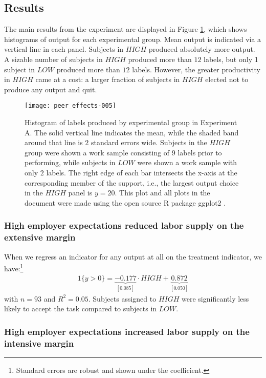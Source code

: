 \documentclass[12pt]{article}
\begin{document}
\subsection{Results} 
The main results from the experiment are displayed in Figure
\ref{fig:ExpA.output}, which shows histograms of output for each
experimental group. Mean output is indicated via a vertical line in
each panel. Subjects in $HIGH$ produced absolutely more output. A
sizable number of subjects in $HIGH$ produced more than $12$ labels,
but only 1 subject in $LOW$ produced more than $12$ labels. However,
the greater productivity in $HIGH$ came at a cost: a larger fraction
of subjects in $HIGH$ elected not to produce any output and quit.

\begin{figure} 
  \centering
\texttt{[image: peer\_effects-005]}
\caption{Histogram of labels produced by experimental group in
  Experiment A\label{fig:ExpA.output}. The solid vertical line
  indicates the mean, while the shaded band around that line is $2$
  standard errors wide. Subjects in the $HIGH$ group were shown a work
  sample consisting of $9$ labels prior to performing, while subjects
  in $LOW$ were shown a work sample with only $2$ labels. The right
  edge of each bar intersects the x-axis at the corresponding member
  of the support, i.e., the largest output choice in the $HIGH$ panel
  is $y=20$.  This plot and all plots in the document were made using
  the open source R package ggplot2 \citep{wickham2008ggplot2}.}
\end{figure} 

\subsubsection{High employer expectations reduced labor supply on the extensive margin}

When we regress an indicator for any output at all on the treatment
indicator, we have:\footnote{Standard errors are robust and shown under
  the coefficient.}
\begin{align}
  1\{y > 0\}  = \underbrace{-0.177}_{[0.085]}\cdot HIGH +  
\underbrace{0.872}_{[0.050]}
\end{align} 
with $n = 93$ and $R^2 = 0.05$. Subjects assigned to
$HIGH$ were significantly less likely to accept the task compared to
subjects in $LOW$. 

\subsubsection{High employer expectations increased labor supply on the intensive margin} 
\end{document}
